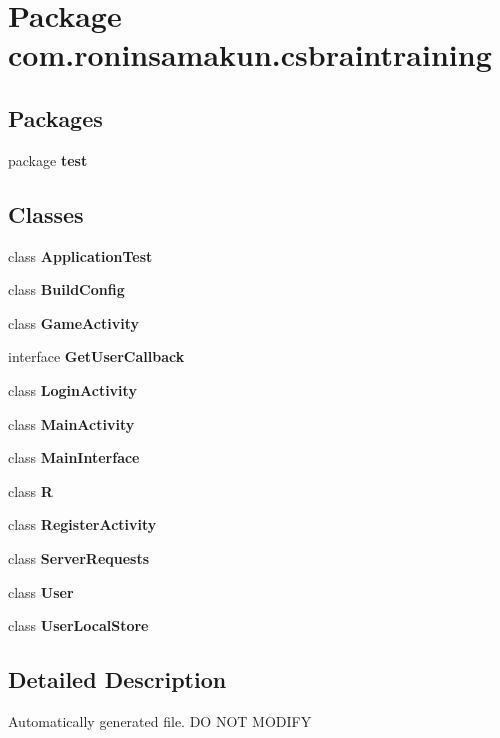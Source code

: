 \section{Package com.\+roninsamakun.\+csbraintraining}
\label{namespacecom_1_1roninsamakun_1_1csbraintraining}
\subsection*{Packages}
\begin{DoxyCompactItemize}
\item 
package {\bf test}
\end{DoxyCompactItemize}
\subsection*{Classes}
\begin{DoxyCompactItemize}
\item 
class {\bf Application\+Test}
\item 
class {\bf Build\+Config}
\item 
class {\bf Game\+Activity}
\item 
interface {\bfseries Get\+User\+Callback}
\item 
class {\bf Login\+Activity}
\item 
class {\bf Main\+Activity}
\item 
class {\bf Main\+Interface}
\item 
class {\bf R}
\item 
class {\bf Register\+Activity}
\item 
class {\bf Server\+Requests}
\item 
class {\bf User}
\item 
class {\bf User\+Local\+Store}
\end{DoxyCompactItemize}


\subsection{Detailed Description}
Automatically generated file. D\+O N\+O\+T M\+O\+D\+I\+F\+Y 